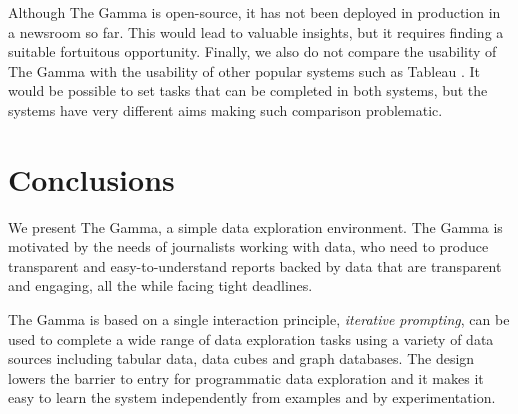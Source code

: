 \documentclass[manuscript,review,anonymous]{acmart}
\begin{document}
Although The Gamma is open-source, it has not been deployed in production in a newsroom so far.
This would lead to valuable insights, but it requires finding a suitable fortuitous opportunity.
Finally, we also do not compare the usability of The Gamma with the usability of other popular
systems such as Tableau \cite{tableau}. It would be possible to set tasks that can be completed
in both systems, but the systems have very different aims making such comparison problematic.

\section{Conclusions}
We present The Gamma, a simple data exploration environment. The Gamma is motivated by the needs
of journalists working with data, who need to produce transparent and easy-to-understand reports
backed by data that are transparent and engaging, all the while facing tight deadlines.

The Gamma is based on a single interaction principle, \emph{iterative prompting}, can be used to
complete a wide range of data exploration tasks using a variety of data sources including tabular
data, data cubes and graph databases. The design lowers the barrier to entry for programmatic
data exploration and it makes it easy to learn the system independently from examples and by
experimentation.


\balance{}



\end{document}

